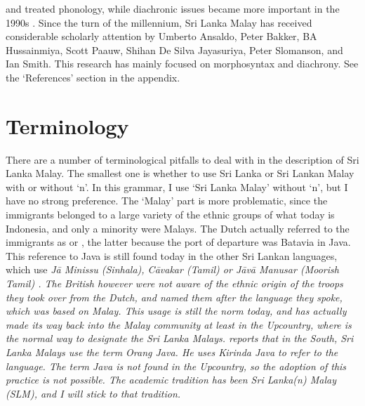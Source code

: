 \citet{Bichsel} and \citet{Tapovanaye1986,Tapovanaye1995} treated phonology, while diachronic issues became more important in the 1990s \citep{Adelaar1991,Bakker1995nl,Bakker1996stuf,Bakker2000convergence,Bakker2000rapid,Bakker2006}. Since the turn of the millennium, Sri Lanka Malay has received considerable scholarly attention by Umberto Ansaldo, Peter Bakker,  BA Hussainmiya,  Scott Paauw,  Shihan De Silva Jayasuriya, Peter Slomanson, and Ian Smith. This research has  mainly focused on morphosyntax and diachrony. See the `References'  section in the appendix.

\section{Terminology}
There are a number of terminological pitfalls to deal with in the description of Sri Lanka Malay. The smallest one is whether to use Sri Lanka or Sri Lankan Malay with or without `n'. In this grammar, I use `Sri Lanka Malay' without `n', but I have no strong preference. The `Malay' part is more problematic, since the immigrants   belonged to a large variety of the ethnic groups of what today is Indonesia, and only a minority were Malays. The Dutch actually referred to the immigrants as  or , the latter because the port of departure was Batavia in Java. This reference to Java is still found today in the other Sri Lankan languages, which use \em J\=a Minissu \em (Sinhala), \em C\=avakar \em (Tamil) or   \em J\=av\=a Manusar \em  (Moorish Tamil) \citep{Hussainmiya1990}. The British however were not aware of the ethnic origin of the troops they took over from the Dutch, and named them after the language they spoke, which was based on Malay. This usage is still the norm today, and has actually made its way back into the Malay community at least in the Upcountry, where  is the normal way to designate the Sri Lanka Malays. \citet{Ansaldo2005ms} reports that in the South, Sri Lanka Malays use the term \em Orang Java. \em He uses \em Kirinda Java \em to refer to the language. The term \em Java \em  is not found in the Upcountry, so  the adoption of this practice is not possible. The academic tradition has been Sri Lanka(n) Malay (SLM), and I will stick to that tradition.

